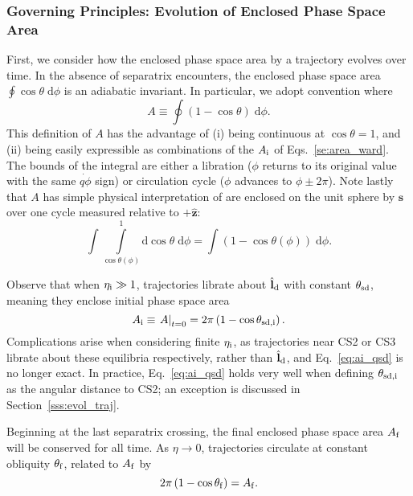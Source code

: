 \documentclass[
        fleqn,
        usenatbib,
        referee,
    ]{mnras}
\newcommand*{\at}[1]{\left.#1\right|}
\newcommand*{\bm}[1]{\boldsymbol{\mathbf{#1}}}
\newcommand*{\uv}[1]{\hat{\bm{#1}}}
\newcommand*{\p}[1]{\left(#1\right)}
\begin{document}
\subsubsection{Governing Principles: Evolution of Enclosed Phase Space
Area}\label{sss:a_evo}

First, we consider how the enclosed phase space area by a trajectory evolves
over time. In the absence of separatrix encounters, the enclosed phase space
area $\oint \cos\theta \;\mathrm{d}\phi$ is an adiabatic invariant. In
particular, we adopt convention where
\begin{equation}
    A \equiv \oint \p{1 - \cos \theta}\;\mathrm{d}\phi.\label{eq:a_oint}
\end{equation}
This definition of $A$ has the advantage of (i) being continuous at $\cos \theta
= 1$, and (ii) being easily expressible as combinations of the $A_{\rm i}$ of
Eqs.~\eqref{se:area_ward}. The bounds of the integral are either a libration
($\phi$ returns to its original value with the same $\dot{q\phi}$ sign) or
circulation cycle ($\phi$ advances to $\phi \pm 2\pi$). Note lastly that $A$ has
simple physical interpretation of are enclosed on the unit sphere by $\uv{s}$
over one cycle measured relative to $+\uv{z}$:
\begin{equation}
    \int \int\limits_{\cos \theta(\phi)}^1
        \mathrm{d}\cos\theta\;\mathrm{d}\phi = \int \p{1 - \cos \theta(\phi)}
            \;\mathrm{d}\phi.
\end{equation}

Observe that when $\eta_{\rm i} \gg 1$, trajectories librate about $\uv{l}_{\rm d}$
with constant $\theta_{\rm sd}$, meaning they enclose initial phase space area
\begin{equation}
    A_{\rm i} \equiv \at{A}_{t = 0}
        = 2\pi\p{1 - \cos \theta_{\rm sd, i}}.\label{eq:ai_qsd}
\end{equation}
Complications arise when considering finite $\eta_{\rm i}$, as trajectories near CS2
or CS3 librate about these equilibria respectively, rather than $\uv{l}_{\rm
d}$, and Eq.~\eqref{eq:ai_qsd} is no longer exact. In practice,
Eq.~\eqref{eq:ai_qsd} holds very well when defining $\theta_{\rm sd, i}$ as the
angular distance to CS2; an exception is discussed in Section~\ref{sss:evol_traj}.

Beginning at the last separatrix crossing, the final enclosed phase space area
$A_{\rm f}$ will be conserved for all time. As $\eta \to 0$, trajectories circulate at
constant obliquity $\theta_{\rm f}$, related to $A_{\rm f}$ by
\begin{equation}
    2\pi\p{1 - \cos \theta_{\rm f}} = A_{\rm f}. \label{eq:qfaf}
\end{equation}
\end{document}
